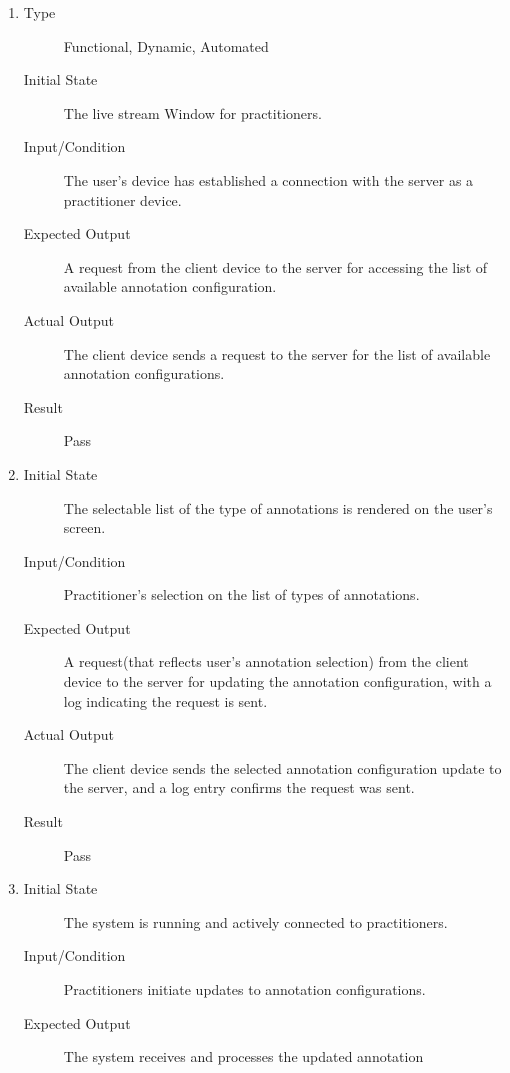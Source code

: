 \documentclass[12pt, titlepage]{article}
\begin{document}
\begin{enumerate}[FR-T1]
  \item \label{FRT4}
    \begin{description}
    \item[Type] Functional, Dynamic, Automated
    \item[Initial State] The live stream Window for practitioners.
    \item[Input/Condition] The user’s device has established a connection with the
      server as a practitioner device.
    \item[Expected Output] A request from the client device to the server for accessing
      the list of available annotation configuration.
    \item[Actual Output] The client device sends a request to the server for the list 
    of available annotation configurations.
    \item[Result] Pass
    \end{description}
  \item \label{FRT5}
    \begin{description}
    \item[Initial State] The selectable list of the type of annotations is
      rendered on the user's screen.
    \item[Input/Condition] Practitioner’s selection on the list of types of
      annotations.
    \item[Expected Output] A request(that reflects user’s annotation selection) from
      the client device to the server for updating the annotation configuration,
      with a log indicating the request is sent.
    \item[Actual Output] The client device sends the selected annotation configuration 
    update to the server, and a log entry confirms the request was sent.
    \item[Result] Pass
    \end{description}
  \item \label{FRT6}
    \begin{description}
    \item[Initial State] The system is running and actively connected to
      practitioners.
    \item[Input/Condition] Practitioners initiate updates to annotation
      configurations.
    \item[Expected Output] The system receives and processes the updated annotation

\end{description}
\end{enumerate}
\end{document}
